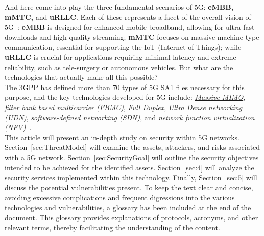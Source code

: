 \documentclass[english]{article}
\begin{document}
And here come into play the three fundamental scenarios of 5G: \textbf{eMBB,
	mMTC,} and \textbf{uRLLC}. Each of these represents a facet of the overall
vision of 5G~\cite{Ji2018Overview}: \textbf{eMBB} is designed for enhanced
mobile broadband, allowing for ultra-fast downloads and high-quality streaming;
\textbf{mMTC} focuses on massive machine-type communication, essential for
supporting the IoT (Internet of Things); while \textbf{uRLLC} is crucial for
applications requiring minimal latency and extreme reliability, such as
tele-surgery or autonomous vehicles. But what are the technologies that
actually make all this possible? \\ \sloppy The 3GPP has defined more than 70
types of 5G SA1 files necessary for this purpose, and the key technologies
developed for 5G include: \textit{\hyperlink{MIMO}{Massive MIMO}},
\textit{\hyperlink{FBMC}{filter bank based multicarrier (FBMC)}},
\textit{\hyperlink{FullDuplex}{Full Duplex}}, \textit{\hyperlink{UDN}{Ultra
		Dense networking (UDN)}}, \textit{\hyperlink{SDN}{software-defined networking
		(SDN)}}, and \textit{\hyperlink{NFV}{network function virtualization
		(NFV)}}~\cite{Ji2018Overview}. \\ This article will present an in-depth study
on security within 5G networks. Section~\ref{sec:ThreatModel} will examine the
assets, attackers, and risks associated with a 5G network.
Section~\ref{sec:SecurityGoal} will outline the security objectives intended to
be achieved for the identified assets. Section~\ref{sec:4} will analyze the
security services implemented within this technology. Finally,
Section~\ref{sec:5} will discuss the potential vulnerabilities present. To keep
the text clear and concise, avoiding excessive complications and frequent
digressions into the various technologies and vulnerabilities, a glossary has
been included at the end of the document. This glossary provides explanations
of protocols, acronyms, and other relevant terms, thereby facilitating the
understanding of the content.
\end{document}
